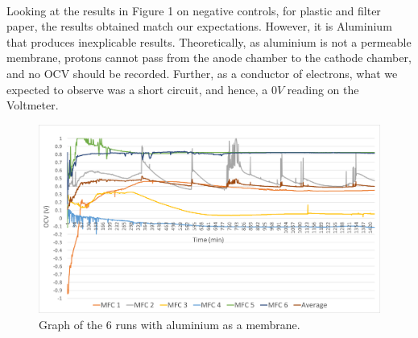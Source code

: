 \documentclass[12pt, twocolumn, a4paper]{article}
\begin{document}
    \paragraph{}Looking at the results in Figure 1 on negative controls, for plastic and filter paper, the results obtained match our expectations. However, it is Aluminium that produces inexplicable results. Theoretically, as aluminium is not a permeable membrane, protons cannot pass from the anode chamber to the cathode chamber, and no OCV should be recorded. Further, as a conductor of electrons, what we expected to observe was a short circuit, and hence, a $0V$ reading on the Voltmeter.
    \begin{figure}
        \centering
        \includegraphics[scale = 0.25]{aluminium.png}
        \caption{Graph of the 6 runs with aluminium as a membrane.}
        \label{fig:my_label}
    \end{figure}
\end{document}
